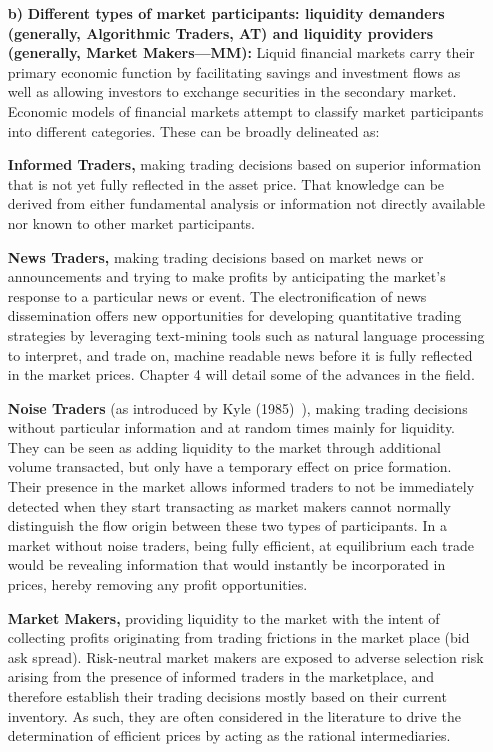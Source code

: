 \begin{enumerate}
\item[\textbf{b)}] \textbf{Different types of market participants: liquidity demanders (generally, Algorithmic Traders, AT) and liquidity providers (generally, Market Makers---MM):}
Liquid financial markets carry their primary economic function by facilitating savings and investment flows as well as allowing investors to exchange securities in the secondary market. Economic models of financial markets attempt to classify market participants into different categories. These can be broadly delineated as: 

\textbf{Informed Traders,} making trading decisions based on superior information that is not yet fully reflected in the asset price. That knowledge can be derived from either fundamental analysis or information not directly available nor known to other market participants.

\textbf{News Traders,} making trading decisions based on market news or announcements and trying to make profits by anticipating the market's response to a particular news or event. The electronification of news dissemination offers new opportunities for developing quantitative trading strategies by leveraging text-mining tools such as natural language processing to interpret, and trade on, machine readable news before it is fully reflected in the market prices. Chapter 4 will detail some of the advances in the field.

\textbf{Noise Traders} (as introduced by Kyle (1985)~\cite{kyle1985}), making trading decisions without particular information and at random times mainly for liquidity. They can be seen as adding liquidity to the market through additional volume transacted, but only have a temporary effect on price formation. Their presence in the market allows informed traders to not be immediately detected when they start transacting as market makers cannot normally distinguish the flow origin between these two types of participants. In a market without noise traders, being fully efficient, at equilibrium each trade would be revealing information that would instantly be incorporated in prices, hereby removing any profit opportunities.

\textbf{Market Makers,} providing liquidity to the market with the intent of collecting profits originating from trading frictions in the market place (bid ask spread). Risk-neutral market makers are exposed to adverse selection risk arising from the presence of informed traders in the marketplace, and therefore establish their trading decisions mostly based on their current inventory. As such, they are often considered in the literature to drive the determination of efficient prices by acting as the rational intermediaries.  


\end{enumerate}
